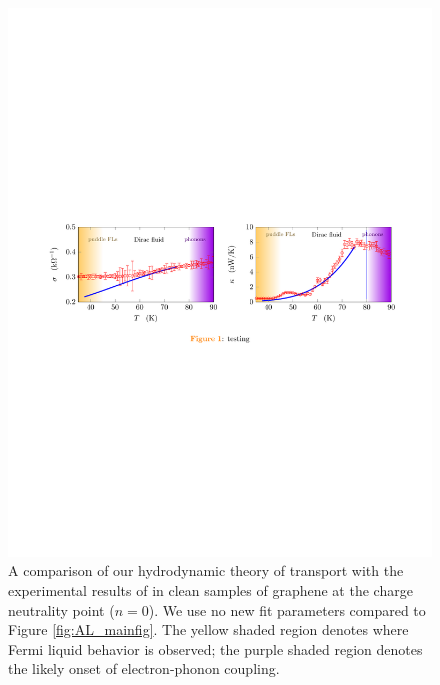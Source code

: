 \begin{figure}
\centering
\includegraphics[width=\textwidth]{figures/hydro_theory/mainfigTplot.pdf}
\caption{A comparison of our hydrodynamic theory of transport with the experimental results of \cite{crossno_observation_2016} in clean samples of graphene at the charge neutrality point ($n=0$).  We use no new fit parameters compared to Figure \ref{fig:AL_mainfig}. The yellow shaded region denotes where Fermi liquid behavior is observed; the purple shaded region denotes the likely onset of electron-phonon coupling.}
\label{fig:AL_mainfigT}
\end{figure}


